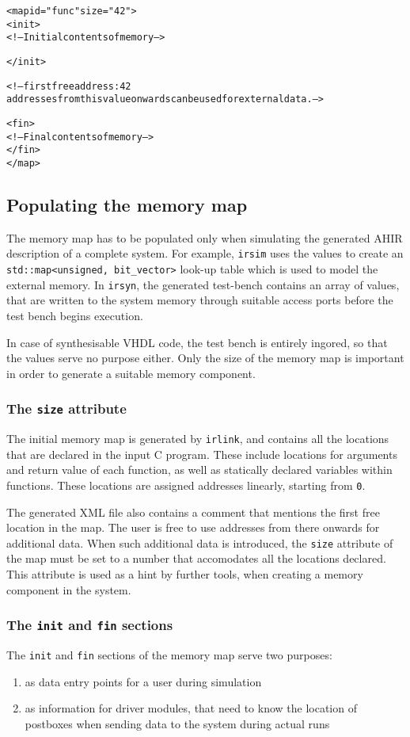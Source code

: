 \documentclass[12pt]{article}
\newcommand{\irlink}{{\tt irlink}}
\newcommand{\irsim}{{\tt irsim}}
\newcommand{\irsyn}{{\tt irsyn}}
\begin{document}
  \begin{alltt}
  <map id="func" size="42">
  <init>
  <!-- Initial contents of memory -->
  
  </init>

  <!-- first free address: 42
   addresses from this value onwards can be used for external data. -->

  <fin>
  <!-- Final contents of memory -->
  </fin>
  </map>\end{alltt}

  \subsection{Populating the memory map}
  
  The memory map has to be populated only when simulating the
  generated AHIR description of a complete system. For example,
  \irsim{} uses the values to create an {\tt std::map<unsigned,
  bit\_vector>} look-up table which is used to model the external
  memory. In \irsyn{}, the generated test-bench contains an array of
  values, that are written to the system memory through suitable
  access ports before the test bench begins execution.

  In case of synthesisable VHDL code, the test bench is entirely
  ingored, so that the values serve no purpose either. Only the size
  of the memory map is important in order to generate a suitable
  memory component.

  \subsubsection*{The {\tt size} attribute}
  
  The initial memory map is generated by \irlink{}, and contains all
  the locations that are declared in the input C program. These
  include locations for arguments and return value of each function,
  as well as statically declared variables within functions. These
  locations are assigned addresses linearly, starting from {\tt 0}.

  The generated XML file also contains a comment that mentions the
  first free location in the map. The user is free to use addresses
  from there onwards for additional data. When such additional data is
  introduced, the {\tt size} attribute of the map must be set to a
  number that accomodates all the locations declared. This attribute
  is used as a hint by further tools, when creating a memory component
  in the system.

  \subsubsection*{The {\tt init} and {\tt fin} sections}

  The {\tt init} and {\tt fin} sections of the memory map serve two
  purposes:

  \begin{enumerate}
    \item as data entry points for a user during simulation
    \item as information for driver modules, that need to know the
      location of postboxes when sending data to the system during
      actual runs
  \end{enumerate}
\end{document}
